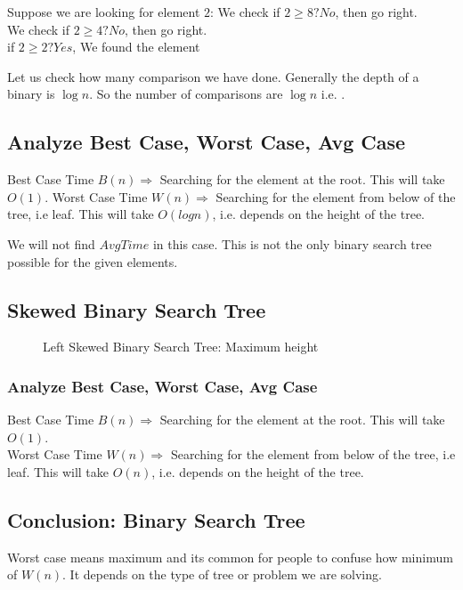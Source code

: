 \documentclass{article}
\begin{document}
Suppose we are looking for element $2$:
We check if $2 \geq 8 ? No$, then go right.\\
We check if $2 \geq 4 ? No$, then go right.\\
if $2 \geq 2 ? Yes $, We found the element

Let us check how many comparison we have done. 
Generally the depth of a binary is $\log{n}$. So the number of comparisons are $\log{n}$ i.e. .

\subsection{Analyze Best Case, Worst Case, Avg Case}
Best Case Time $B(n) \Longrightarrow $ Searching for the element at the root. This will take $O(1)$.
Worst Case Time $W(n) \Longrightarrow $ Searching for the element from below of the tree, i.e leaf. This will take $O(log{n})$, i.e. depends on the height of the tree.

We will not find $AvgTime$ in this case.
This is not the only binary search tree possible for the given elements.

\subsection{Skewed Binary Search Tree}
\begin{figure}[H]
    \centering
    \caption{Left Skewed Binary Search Tree: Maximum height}
\end{figure}

\subsubsection{Analyze Best Case, Worst Case, Avg Case}
Best Case Time $B(n) \Longrightarrow $ Searching for the element at the root. This will take $O(1)$.\\
Worst Case Time $W(n) \Longrightarrow $ Searching for the element from below of the tree, i.e leaf. This will take $O(n)$, i.e. depends on the height of the tree.

\subsection{Conclusion: Binary Search Tree}

Worst case means maximum and its common for people to confuse how minimum of $W(n)$. It depends on the type of tree or problem we are solving.
\end{document}
